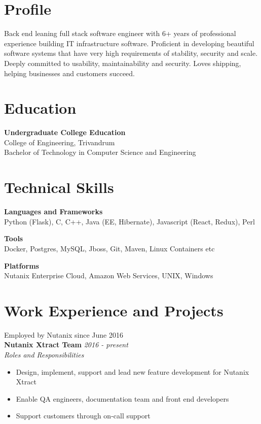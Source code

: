 \documentclass[line,margin]{res}
\begin{document}


\address{joji\_antony@gmx.com}
\address{+91 96323 41954}

\begin{resume}

\section{Profile}
Back end leaning full stack software engineer with 6+ years of professional experience building IT infrastructure software. Proficient in developing beautiful software systems that have very high requirements of stability, security and scale. Deeply committed to usability, maintainability and security. Loves shipping, helping businesses and customers succeed.

\section{Education}
{\bf Undergraduate College Education}\\
College of Engineering, Trivandrum\\
Bachelor of Technology in Computer Science and Engineering\\

\section{Technical Skills}

{\bf Languages and Frameworks}\\
Python (Flask), C, C++, Java (EE, Hibernate), Javascript (React, Redux), Perl

{\bf Tools}\\
Docker, Postgres, MySQL, Jboss, Git, Maven, Linux Containers etc

{\bf Platforms}\\
Nutanix Enterprise Cloud, Amazon Web Services, UNIX, Windows

\section{Work Experience and Projects}

Employed by Nutanix since June 2016\\

{\bf Nutanix Xtract Team} \hfill {\it{2016 - present}}\\

{\it{Roles and Responsibilities}}\\
\begin{itemize}
\item Design, implement, support and lead new feature development for Nutanix Xtract
\item Enable QA engineers, documentation team and front end developers
\item Support customers through on-call support
\end{itemize}


\end{resume}
\end{document}
